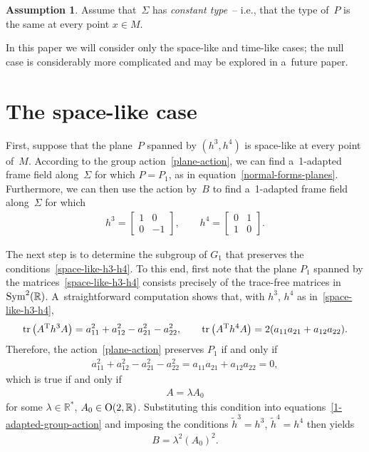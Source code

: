 \documentclass[pdftex]{sigma}
\numberwithin{equation}{section}
\theoremstyle{definition}
\newtheorem{assumption}[teo]{Assumption}
\DeclareMathOperator{\tr}{tr}
\begin{document}
\begin{assumption}
\label{constant-type-assumption}
Assume that~$\Sigma$ has {\em constant type}~-- i.e., that the type of~$P$ is the same at every point $x \in M$.
\end{assumption}

In this paper we will consider only the space-like and time-like cases; the null case is considerably more complicated and
may be explored in a~future paper.


\section{The space-like case}\label{space-like-sec}

First, suppose that the plane~$P$ spanned by $(h^3, h^4)$ is space-like at every point of~$M$.
According to the group action~\eqref{plane-action}, we can f\/ind a~1-adapted frame f\/ield along~$\Sigma$ for which
$P=P_1$, as in equation~\eqref{normal-forms-planes}.
Furthermore, we can then use the action by~$B$ to f\/ind a~1-adapted frame f\/ield along~$\Sigma$ for which
\begin{gather}
\label{space-like-h3-h4}
h^3 =
\begin{bmatrix}
1 & 0
\\
0 & -1
\end{bmatrix},
\qquad
h^4 =
\begin{bmatrix}
0 & 1
\\
1 & 0
\end{bmatrix}.
\end{gather}

The next step is to determine the subgroup of $G_1$ that preserves the conditions~\eqref{space-like-h3-h4}.
To this end, f\/irst note that the plane $P_1$ spanned by the matrices~\eqref{space-like-h3-h4} consists precisely of the
trace-free matrices in ${\rm Sym}^2(\mathbb{R})$.
A~straightforward computation shows that, with $h^3$, $h^4$ as in~\eqref{space-like-h3-h4},
\begin{gather*}
\tr\big(A^{\rm T} h^3 A\big) = a_{11}^2 + a_{12}^2 - a_{21}^2 - a_{22}^2,
\qquad
\tr\big(A^{\rm T} h^4 A\big) = 2(a_{11} a_{21} + a_{12} a_{22}).
\end{gather*}
Therefore, the action~\eqref{plane-action} preserves $P_1$ if and only if
\begin{gather*}
a_{11}^2 + a_{12}^2 - a_{21}^2 - a_{22}^2 = a_{11} a_{21} + a_{12} a_{22} = 0,
\end{gather*}
which is true if and only if
\begin{gather*}
A = \lambda A_0
\end{gather*}
for some $\lambda \in \mathbb{R}^*$, $A_0 \in {\rm O}(2, \mathbb{R})$.
Substituting this condition into equations~\eqref{1-adapted-group-action} and imposing the conditions $\tilde{h}^3 =
h^3$, $\tilde{h}^4 = h^4$ then yields
\begin{gather*}
B = \lambda^2 (A_0)^2.
\end{gather*}
\end{document}
